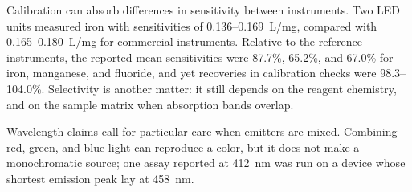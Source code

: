 Calibration can absorb differences in sensitivity between instruments. Two LED units measured iron with sensitivities of 0.136--0.169~L/mg, compared with 0.165--0.180~L/mg for commercial instruments. Relative to the reference instruments, the reported mean sensitivities were 87.7\%, 65.2\%, and 67.0\% for iron, manganese, and fluoride, and yet recoveries in calibration checks were 98.3--104.0\%.\citep{prairie2020accurate} Selectivity is another matter: it still depends on the reagent chemistry, and on the sample matrix when absorption bands overlap.\citep{clippard2016construction,jesus2025modular,cirrone2025low}

Wavelength claims call for particular care when emitters are mixed. Combining red, green, and blue light can reproduce a color, but it does not make a monochromatic source; one assay reported at 412~nm was run on a device whose shortest emission peak lay at 458~nm.\citep{kerestes2023affordable}
